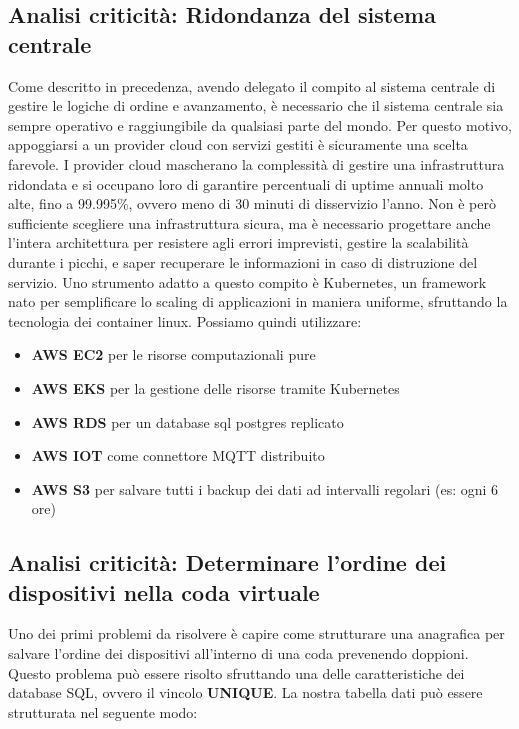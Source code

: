 \documentclass[a4paper, titlepage, 12pt, openright, twoside]{book}
\begin{document}
\subsection{Analisi criticità: Ridondanza del sistema centrale}

Come descritto in precedenza, avendo delegato il compito al sistema centrale di gestire le logiche di ordine e avanzamento, è necessario che il sistema centrale sia sempre operativo
e raggiungibile da qualsiasi parte del mondo. Per questo motivo, appoggiarsi a un provider cloud con servizi gestiti è sicuramente una scelta farevole. I provider cloud mascherano
la complessità di gestire una infrastruttura ridondata e si occupano loro di garantire percentuali di uptime annuali molto alte, fino a 99.995\%, ovvero meno di 30 minuti di disservizio l'anno. Non è però sufficiente scegliere una infrastruttura sicura, ma è necessario progettare anche l'intera architettura per resistere agli errori imprevisti, gestire la scalabilità durante i picchi, e saper recuperare le informazioni in caso di distruzione del servizio. Uno strumento adatto a questo compito è Kubernetes, un framework nato per semplificare lo scaling di applicazioni in maniera uniforme, sfruttando la tecnologia dei container linux. Possiamo quindi utilizzare:
\begin{itemize}
	\item \textbf{AWS EC2} per le risorse computazionali pure
	\item \textbf{AWS EKS} per la gestione delle risorse tramite Kubernetes
	\item \textbf{AWS RDS} per un database sql postgres replicato
	\item \textbf{AWS IOT} come connettore MQTT distribuito
	\item \textbf{AWS S3} per salvare tutti i backup dei dati ad intervalli regolari (es: ogni 6 ore)
\end{itemize}

\subsection{Analisi criticità: Determinare l'ordine dei dispositivi nella coda virtuale}

Uno dei primi problemi da risolvere è capire come strutturare una anagrafica per salvare l'ordine dei dispositivi all'interno di una coda prevenendo doppioni.
Questo problema può essere risolto sfruttando una delle caratteristiche dei database SQL, ovvero il vincolo \textbf{UNIQUE}.
La nostra tabella dati può essere strutturata nel seguente modo:
\end{document}
